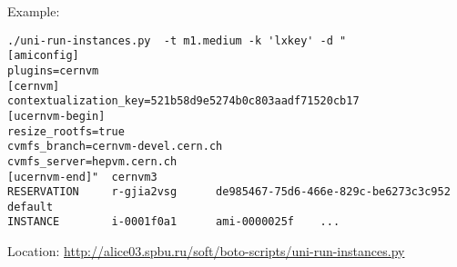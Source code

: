 \noindent Example:
\begin{lstlisting}
./uni-run-instances.py  -t m1.medium -k 'lxkey' -d "
[amiconfig]
plugins=cernvm
[cernvm]
contextualization_key=521b58d9e5274b0c803aadf71520cb17
[ucernvm-begin]
resize_rootfs=true
cvmfs_branch=cernvm-devel.cern.ch
cvmfs_server=hepvm.cern.ch
[ucernvm-end]"  cernvm3
RESERVATION     r-gjia2vsg      de985467-75d6-466e-829c-be6273c3c952    default
INSTANCE        i-0001f0a1      ami-0000025f    ...
\end{lstlisting}
Location: \url{http://alice03.spbu.ru/soft/boto-scripts/uni-run-instances.py}

